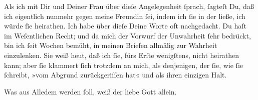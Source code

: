 \pstart
           Als ich \label{K_L03389-8v}\label{K_L03389-8} mit Dir und Deiner Frau über dieſe Angelegenheit ſprach, ſagteſt Du, daß ich eigentlich nunmehr
               gegen  meine Freundin ſei, indem ich ſie in {\pb}der \label{K_L03389-9v}\label{K_L03389-9} ließe, ich würde ſie
               heirathen. Ich habe über dieſe Deine Worte oft nachgedacht. \strikeout{\textcolor{gray}{D}} Du haſt im Weſentlichen Recht; und da mich der Vorwurf der Unwahrheit ſehr
               bedrückt, bin ich ſeit Wochen bemüht, in meinen Briefen allmälig zur Wahrheit
               einzulenken. Sie weiß heut, daß ich ſie, fürs Erſte wenigſtens, nicht heirathen kann;
               aber ſie klammert ſich trotzdem an mich, als  denjenigen, der ſie, wie ſie ſchreibt, »vom Abgrund zurückgeriſſen hat« und
               als ihren einzigen Halt.\pend
           
\pstart
           Was aus Alledem werden ſoll, weiß der liebe Gott allein.\pend
           
